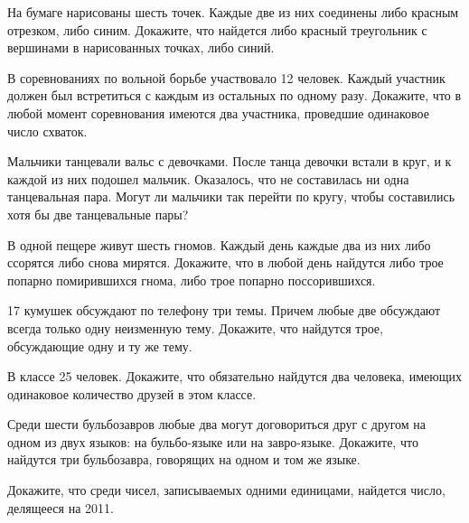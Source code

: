\begin{thm}
	На бумаге нарисованы шесть точек. Каждые две из них соединены либо красным отрезком, либо синим. Докажите, что найдется либо красный треугольник с вершинами в нарисованных точках, либо синий.
\end{thm}

\begin{thm}
	В соревнованиях по вольной борьбе участвовало 12 человек. Каждый участник должен был встретиться с каждым из остальных по одному разу. Докажите, что в любой момент соревнования имеются два участника, проведшие одинаковое число схваток.
\end{thm}

\begin{thm} \label{2.3 thm2.33}
	Мальчики танцевали вальс с девочками. После танца девочки встали в круг, и к каждой из них подошел мальчик. Оказалось, что не составилась ни одна танцевальная пара. Могут ли мальчики так перейти по кругу, чтобы составились хотя бы две танцевальные пары?
\end{thm}

\begin{thm}
	В одной пещере живут шесть гномов. Каждый день каждые два из них либо ссорятся либо снова мирятся. Докажите, что в любой день найдутся либо трое попарно помирившихся гнома, либо трое попарно поссорившихся.
\end{thm}

\begin{thm}
	17 кумушек обсуждают по телефону три темы. Причем любые две обсуждают всегда только одну неизменную тему. Докажите, что найдутся трое, обсуждающие одну и ту же тему.
\end{thm}

\begin{thm}
	В классе 25 человек. Докажите, что обязательно найдутся два человека, имеющих одинаковое количество друзей в этом классе.
\end{thm}

\begin{thm}
	Среди шести бульбозавров любые два могут договориться друг с другом на одном из двух языков: на бульбо-языке или на завро-языке. Докажите, что найдутся три бульбозавра, говорящих на одном и том же языке.
\end{thm}
\begin{thm}
	Докажите, что среди чисел, записываемых одними единицами, найдется число, делящееся на 2011.
\end{thm}

